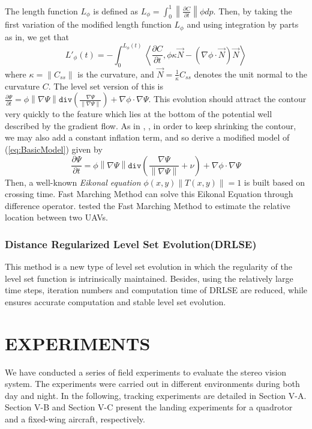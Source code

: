\documentclass[letterpaper, 10 pt, conference]{ieeeconf}  %
\begin{document}
The length function $L_\phi $  is defined as $ L_\phi = \int_{0}^{1}  \left\| \frac{\partial C}{\partial t}  \right\| \phi dp$. Then, by taking the first variation of the modified length function $L_\phi $  and using integration by parts as in, we get that 
\begin{equation}  L'_\phi(t) = - \int_{0}^{L_\phi(t)} \left\langle \frac{\partial C}{\partial t}, \phi \kappa \vec{N} - ( \nabla \phi \cdot \vec{N})\vec{N}   \right\rangle\end{equation}
where $ \kappa = \left\| C_{ss}  \right\| $  is the curvature, and $ \vec{N} = \frac{1}{\kappa}  C_{ss}$ denotes the unit normal to the curvature  $C$. The level set version of this is $ \frac{\partial \Psi}{\partial t}   =   \phi \left\|\nabla\Psi\right\|  \texttt{div}(\frac{\nabla \Psi}{\left\|\nabla\Psi\right\|})  + \nabla \phi \cdot \nabla \Psi$. This evolution should attract the contour very quickly to the feature which lies at the bottom of the potential well described by the gradient flow. As in \cite{sethian1985curvature}, \cite{osher1988fronts}, in order to keep shrinking the contour, we may also add a constant inflation term, and so derive a modified model of (\ref{eq:BasicModel}) given by
\begin{equation}  \frac{\partial \Psi}{\partial t}   =   \phi \left\|\nabla\Psi\right\|  \texttt{div}(\frac{\nabla \Psi}{\left\|\nabla\Psi\right\|} + \nu)  + \nabla \phi \cdot \nabla \Psi\end{equation}
Then, a well-known {\it Eikonal equation} $\phi(x,y)\left\|T(x,y)\right\| = 1$  is built based on crossing time. Fast Marching Method can solve this Eikonal Equation through difference operator. \cite{johnson2007real} tested the Fast Marching Method to estimate the relative location between two UAVs.  
\subsubsection{Distance Regularized Level Set Evolution(DRLSE) \cite{Li2010}}
This method is a new type of level set evolution in which the regularity of the level set function is intrinsically maintained. Besides, using the relatively large time steps, iteration numbers and computation time of DRLSE are reduced, while ensures accurate computation and stable level set evolution.

   
\section{EXPERIMENTS}
We have conducted a series of field experiments to evaluate the stereo vision system. The experiments were carried out in different environments during both day and night. In the following, tracking experiments are detailed in Section V-A. Section V-B and Section V-C present the landing experiments for a quadrotor and a fixed-wing aircraft, respectively.
\end{document}
